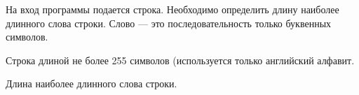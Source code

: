 На вход программы подается строка. Необходимо определить длину наиболее длинного слова строки. Слово --- это последовательность только буквенных символов.   

\InputFile

\noindent
Строка длиной не более 255 символов (используется только английский алфавит. 

\OutputFile

Длина наиболее длинного слова строки. 

\SAMPLES


